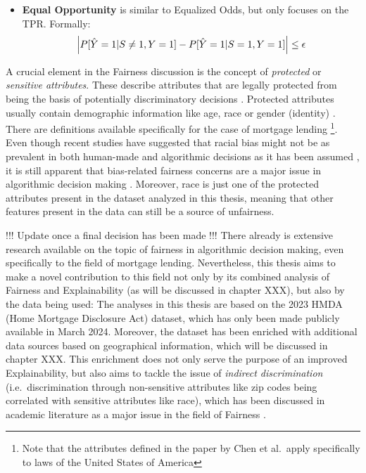 \begin{itemize}
    \item \textbf{Equal Opportunity} is similar to Equalized Odds, but only focuses on the TPR. Formally:
    \begin{equation}
    \left| P[\hat{Y} = 1|S \neq 1, Y = 1] - P[\hat{Y} = 1|S = 1, Y = 1] \right| \leq \epsilon
    \label{eq:equal_opportunity}
    \addcontentsline{frm}{formulas}{\protect\numberline{\theequation}\hspace{1em}Equal Opportunity}
    \end{equation}
\end{itemize}



A crucial element in the Fairness discussion is the concept of \textit{protected} or \textit{sensitive attributes}. These describe attributes that are legally protected from being the basis of potentially discriminatory decisions \parencite{Datta2017}.
Protected attributes usually contain demographic information like age, race or gender (identity) \parencite{Teodorescu2020}. There are definitions available specifically for the case of mortgage lending \parencite{Chen2019}\footnote{Note that the attributes defined in the paper by Chen et al.\ apply specifically to laws of the United States of America}. 
Even though recent studies have suggested that racial bias might not be as prevalent in both human-made and algorithmic decisions as it has been assumed \parencite{Bhutta2022}, 
it is still apparent that bias-related fairness concerns are a major issue in algorithmic decision making \parencite{Mehrabi2021}.
Moreover, race is just one of the protected attributes present in the dataset analyzed in this thesis, meaning that other features present in the data can still be a source of unfairness.


!!! Update once a final decision has been made !!!
There already is extensive research available on the topic of fairness in algorithmic decision making, even specifically to the field of mortgage lending.
Nevertheless, this thesis aims to make a novel contribution to this field not only by its combined analysis of Fairness and Explainability (as will be discussed in chapter XXX),
but also by the data being used: The analyses in this thesis are based on the 2023 HMDA (Home Mortgage Disclosure Act) dataset, which has only been made publicly available in March 2024.
Moreover, the dataset has been enriched with additional data sources based on geographical information, which will be discussed in chapter XXX.
This enrichment does not only serve the purpose of an improved Explainability, but also aims to tackle the issue of \textit{indirect discrimination} (i.e.\ discrimination through non-sensitive attributes like zip codes being correlated with sensitive attributes like race), 
which has been discussed in academic literature as a major issue in the field of Fairness \parencite{Mehrabi2021}.

